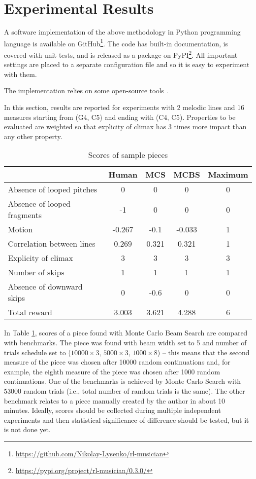 \documentclass{article}
\begin{document}
\section{Experimental Results}
\label{sec:results}

A software implementation of the above methodology in Python programming language is available on GitHub\footnote{\url{https://github.com/Nikolay-Lysenko/rl-musician}}. The code has built-in documentation, is covered with unit tests, and is released as a package on PyPI\footnote{\url{https://pypi.org/project/rl-musician/0.3.0/}}. All important settings are placed to a separate configuration file and so it is easy to experiment with them.

The implementation relies on some open-source tools \cite{brockman2016openai,oliphant2006guide,raffel2014intuitive}.

In this section, results are reported for experiments with 2 melodic lines and 16 measures starting from (G4, C5) and ending with (C4, C5). Properties to be evaluated are weighted so that explicity of climax has 3 times more impact than any other property.

\begin{table}[h!]
	\caption{Scores of sample pieces}
	\label{table:scores}
	\begin{center}
		\begin{tabular}{|l|c|c|c|c|}
			\hline
			& Human & MCS & MCBS & Maximum\\
			\hline
			Absence of looped pitches & 0 & 0 & 0 & 0\\
			\hline
			Absence of looped fragments & -1 & 0 & 0 & 0\\
			\hline
			Motion & -0.267 & -0.1 & -0.033 & 1\\
			\hline
			Correlation between lines & 0.269 & 0.321 & 0.321 & 1\\
			\hline
			Explicity of climax & 3 & 3 & 3 & 3\\
			\hline
			Number of skips & 1 & 1 & 1 & 1\\
			\hline
			Absence of downward skips & 0 & -0.6 & 0 & 0\\
			\hline
			Total reward & 3.003 & 3.621 & 4.288 & 6\\
			\hline
		\end{tabular}
	\end{center}
\end{table}

In Table \ref{table:scores}, scores of a piece found with Monte Carlo Beam Search are compared with benchmarks. The piece was found with beam width set to 5 and number of trials schedule set to ($10000 \times 3$, $5000 \times 3$, $1000 \times 8$) -- this means that the second measure of the piece was chosen after 10000 random continuations and, for example, the eighth measure of the piece was chosen after 1000 random continuations. One of the benchmarks is achieved by Monte Carlo Search with 53000 random trials (i.e., total number of random trials is the same). The other benchmark relates to a piece manually created by the author in about 10 minutes. Ideally, scores should be collected during multiple independent experiments and then statistical significance of difference should be tested, but it is not done yet.
\end{document}
